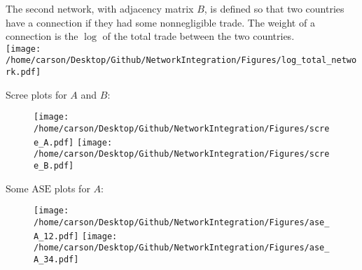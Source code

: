 \documentclass[notheorems]{beamer}
\theoremstyle{definition}
\begin{document}
\begin{frame}
The second network, with adjacency matrix $B$, is defined so that two countries have a connection if they had some nonnegligible trade. The weight of a connection is the $\log$ of the total trade between the two countries. \\
\texttt{[image: /home/carson/Desktop/Github/NetworkIntegration/Figures/log\_total\_network.pdf]}
\end{frame}





















\begin{frame}
Scree plots for $A$ and $B$:\\

\begin{figure}
   \texttt{[image: /home/carson/Desktop/Github/NetworkIntegration/Figures/scree\_A.pdf]}
   \hfill
   \texttt{[image: /home/carson/Desktop/Github/NetworkIntegration/Figures/scree\_B.pdf]}
\end{figure}
\end{frame}



















\begin{frame}
Some $\text{ASE}$ plots for $A$:
\begin{figure}
   \texttt{[image: /home/carson/Desktop/Github/NetworkIntegration/Figures/ase\_A\_12.pdf]}
   \hfill
   \texttt{[image: /home/carson/Desktop/Github/NetworkIntegration/Figures/ase\_A\_34.pdf]}
\end{figure}
\end{frame}
\end{document}

